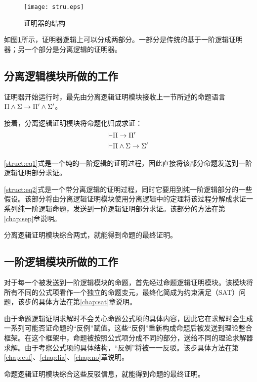 \begin{figure}[!htbp]
  \centering
  \texttt{[image: stru.eps]}
  \caption{证明器的结构}
  \label{struct:fig}
\end{figure}

如图\ref{struct:fig}所示，证明器逻辑上可以分成两部分。一部分是传统的基于一阶逻辑证明器；另一个部分是分离逻辑的证明器。

\subsection{分离逻辑模块所做的工作}
证明器开始运行时，最先由分离逻辑证明模块接收上一节所述的命题语言$\Pi \land \Sigma \rightarrow \Pi' \land \Sigma'$。

接着，分离逻辑证明模块将命题化归成求证：
\begin{eqnarray}
  \vdash & \Pi \rightarrow \Pi' \label{struct:eq1}\\
  \vdash & \Pi \land \Sigma \rightarrow \Sigma' \label{struct:eq2}
\end{eqnarray}

\ref{struct:eq1}式是一个纯的一阶逻辑的证明过程，因此直接将该部分命题发送到一阶逻辑证明部分求证。

\ref{struct:eq2}式是一个带分离逻辑的证明过程，同时它要用到纯一阶逻辑部分的一些假设。该部分将由分离逻辑证明模块使用分离逻辑中的定理将该过程分解成求证一系列纯一阶逻辑命题，发送到一阶逻辑证明部分求证。该部分的方法在第\ref{chap:sep}章说明。

分离逻辑证明模块综合两式，就能得到命题的最终证明。

\subsection{一阶逻辑模块所做的工作}
对于每一个被发送到一阶逻辑模块的命题，首先经过命题逻辑证明模块。该模块将所有不同的公式项看作一个独立的命题变元，最终化简成为约束满足（SAT）问题，该步的具体方法在第\ref{chap:sat}章说明。

由于命题逻辑证明求解时不会关心命题公式项的具体内容，因此它在求解时会生成一系列可能否证命题的``反例''赋值。这些``反例''重新构成命题后被发送到理论整合框架。在这个框架中，命题被按照公式项分成不同的部分，送给不同的理论求解器求解。由于考察公式项的具体结构，``反例''将被一一反驳。该步具体方法在第\ref{chap:euf}、\ref{chap:lia}、\ref{chap:no}章说明。

命题逻辑证明模块综合这些反驳信息，就能得到命题的最终证明。

